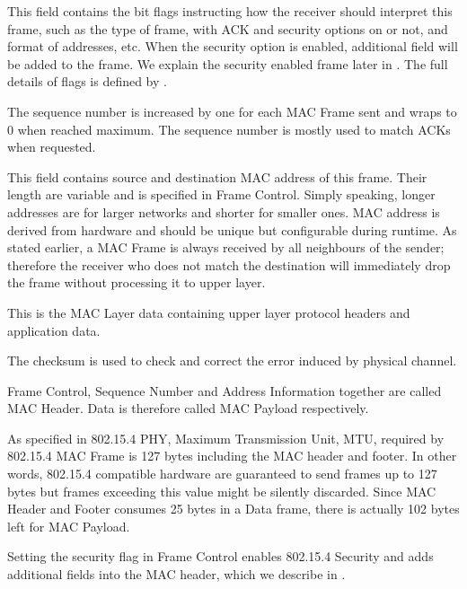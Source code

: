 \begin{description}[style=nextline]
	\item[\textbf{Frame Control}]
	This field contains the bit flags instructing how the receiver should interpret this frame, such as the type of frame, with ACK and security options on or not, and format of addresses, etc. When the security option is enabled, additional field will be added to the frame. We explain the security enabled frame later in . The full details of flags is defined by \cite{802154}.
	
	\item[\textbf{Sequence Number}]
	The sequence number is increased by one for each MAC Frame sent and wraps to 0 when reached maximum. The sequence number is mostly used to match ACKs when requested.
	
	\item[\textbf{Address Information}]
	This field contains source and destination MAC address of this frame. Their length are variable and is specified in Frame Control. Simply speaking, longer addresses are for larger networks and shorter for smaller ones. MAC address is derived from hardware and should be unique but configurable during runtime. As stated earlier, a MAC Frame is always received by all neighbours of the sender; therefore the receiver who does not match the destination will immediately drop the frame without processing it to upper layer.
	
	\item[\textbf{Data}]
	This is the MAC Layer data containing upper layer protocol headers and application data.
	
	\item[\textbf{Frame Checksum}]
	The checksum is used to check and correct the error induced by physical channel.
\end{description}

Frame Control, Sequence Number and Address Information together are called MAC Header. Data is therefore called MAC Payload respectively. 

As specified in 802.15.4 PHY, Maximum Transmission Unit, MTU, required by 802.15.4 MAC Frame is 127 bytes including the MAC header and footer. In other words, 802.15.4 compatible hardware are guaranteed to send frames up to 127 bytes but frames exceeding this value might be silently discarded. Since MAC Header and Footer consumes 25 bytes in a Data frame, there is actually 102 bytes left for MAC Payload.

Setting the security flag in Frame Control enables 802.15.4 Security and adds additional fields into the MAC header, which we describe in .

